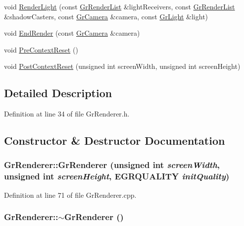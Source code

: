 \begin{CompactItemize}
\item 
void \hyperlink{class_gr_renderer_e67d78d01c3f6c8cd69cec7eeeeb8e03}{RenderLight} (const \hyperlink{class_gr_render_list}{GrRenderList} \&lightReceivers, const \hyperlink{class_gr_render_list}{GrRenderList} \&shadowCasters, const \hyperlink{class_gr_camera}{GrCamera} \&camera, const \hyperlink{class_gr_light}{GrLight} \&light)
\item 
void \hyperlink{class_gr_renderer_3e1dbac87b12049ca2e0341662ebc8a6}{EndRender} (const \hyperlink{class_gr_camera}{GrCamera} \&camera)
\item 
void \hyperlink{class_gr_renderer_92f2baaa0b18549e04bc8e5361cfe676}{PreContextReset} ()
\item 
void \hyperlink{class_gr_renderer_ce226ce944cecd180bc8aa02173cee3b}{PostContextReset} (unsigned int screenWidth, unsigned int screenHeight)
\end{CompactItemize}


\subsection{Detailed Description}


Definition at line 34 of file GrRenderer.h.

\subsection{Constructor \& Destructor Documentation}
\hypertarget{class_gr_renderer_73cd9f551be328f0b6bb0548a52603c1}{
\subsubsection[{GrRenderer}]{\setlength{\rightskip}{0pt plus 5cm}GrRenderer::GrRenderer (unsigned int {\em screenWidth}, \/  unsigned int {\em screenHeight}, \/  {\bf EGRQUALITY} {\em initQuality})}}
\label{class_gr_renderer_73cd9f551be328f0b6bb0548a52603c1}




Definition at line 71 of file GrRenderer.cpp.\hypertarget{class_gr_renderer_50282617350b0dd1666b9f7ea59864cb}{
\subsubsection[{$\sim$GrRenderer}]{\setlength{\rightskip}{0pt plus 5cm}GrRenderer::$\sim$GrRenderer ()}}
\label{class_gr_renderer_50282617350b0dd1666b9f7ea59864cb}




